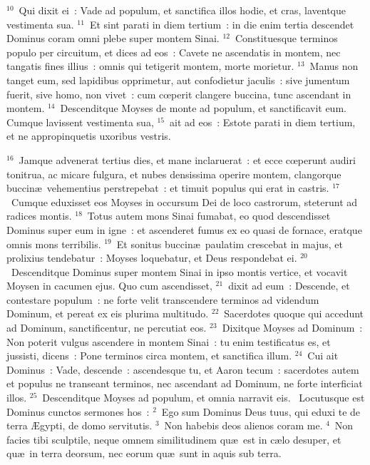 ${}^{10}$~Qui dixit ei~: Vade ad populum, et sanctifica illos hodie, et cras, laventque vestimenta sua.
${}^{11}$~Et sint parati in diem tertium~: in die enim tertia descendet Dominus coram omni plebe super montem Sinai.
${}^{12}$~Constituesque terminos populo per circuitum, et dices ad eos~: Cavete ne ascendatis in montem, nec tangatis fines illius~: omnis qui tetigerit montem, morte morietur.
${}^{13}$~Manus non tanget eum, sed lapidibus opprimetur, aut confodietur jaculis~: sive jumentum fuerit, sive homo, non vivet~: cum cœperit clangere buccina, tunc ascendant in montem.
${}^{14}$~Descenditque Moyses de monte ad populum, et sanctificavit eum. Cumque lavissent vestimenta sua,
${}^{15}$~ait ad eos~: Estote parati in diem tertium, et ne appropinquetis uxoribus vestris.


${}^{16}$~Jamque advenerat tertius dies, et mane inclaruerat~: et ecce cœperunt audiri tonitrua, ac micare fulgura, et nubes densissima operire montem, clangorque buccin\ae\ vehementius perstrepebat~: et timuit populus qui erat in castris.
${}^{17}$~Cumque eduxisset eos Moyses in occursum Dei de loco castrorum, steterunt ad radices montis.
${}^{18}$~Totus autem mons Sinai fumabat, eo quod descendisset Dominus super eum in igne~: et ascenderet fumus ex eo quasi de fornace, eratque omnis mons terribilis.
${}^{19}$~Et sonitus buccin\ae\ paulatim crescebat in majus, et prolixius tendebatur~: Moyses loquebatur, et Deus respondebat ei.
${}^{20}$~Descenditque Dominus super montem Sinai in ipso montis vertice, et vocavit Moysen in cacumen ejus. Quo cum ascendisset,
${}^{21}$~dixit ad eum~: Descende, et contestare populum~: ne forte velit transcendere terminos ad videndum Dominum, et pereat ex eis plurima multitudo.
${}^{22}$~Sacerdotes quoque qui accedunt ad Dominum, sanctificentur, ne percutiat eos.
${}^{23}$~Dixitque Moyses ad Dominum~: Non poterit vulgus ascendere in montem Sinai~: tu enim testificatus es, et jussisti, dicens~: Pone terminos circa montem, et sanctifica illum.
${}^{24}$~Cui ait Dominus~: Vade, descende~: ascendesque tu, et Aaron tecum~: sacerdotes autem et populus ne transeant terminos, nec ascendant ad Dominum, ne forte interficiat illos.
${}^{25}$~Descenditque Moyses ad populum, et omnia narravit eis.
~\lettrine[lines=10,image=true,loversize=0.05,lraise=-0.03]{L}{}ocutusque est Dominus cunctos sermones hos~:
${}^{2}$~Ego sum Dominus Deus tuus, qui eduxi te de terra \AE gypti, de domo servitutis.
${}^{3}$~Non habebis deos alienos coram me.
${}^{4}$~Non facies tibi sculptile, neque omnem similitudinem qu\ae\ est in c\ae lo desuper, et qu\ae\ in terra deorsum, nec eorum qu\ae\ sunt in aquis sub terra.
